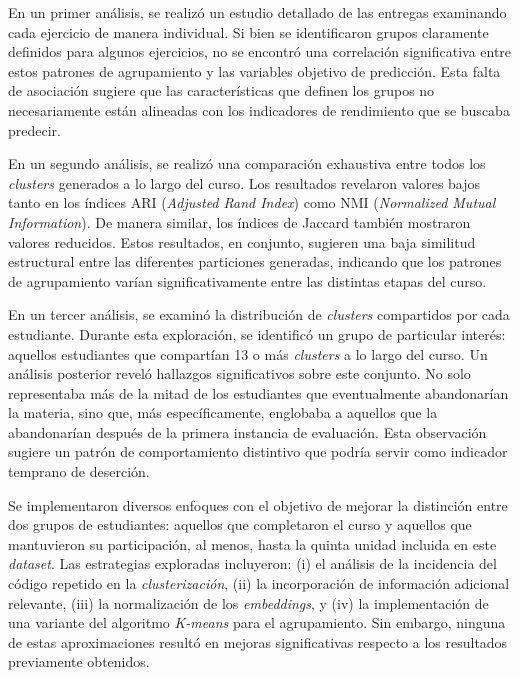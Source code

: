 \documentclass[11pt,a4paper,twoside,openany]{tesis}
\begin{document}
En un primer análisis, se realizó un estudio detallado de las entregas examinando cada ejercicio de manera individual. Si bien se identificaron grupos claramente definidos para algunos ejercicios, no se encontró una correlación significativa entre estos patrones de agrupamiento y las variables objetivo de predicción. Esta falta de asociación sugiere que las características que definen los grupos no necesariamente están alineadas con los indicadores de rendimiento que se buscaba predecir.

En un segundo análisis, se realizó una comparación exhaustiva entre todos los \emph{clusters} generados a lo largo del curso. Los resultados revelaron valores bajos tanto en los índices ARI (\emph{Adjusted Rand Index}) como NMI (\emph{Normalized Mutual Information}). De manera similar, los índices de Jaccard también mostraron valores reducidos. Estos resultados, en conjunto, sugieren una baja similitud estructural entre las diferentes particiones generadas, indicando que los patrones de agrupamiento varían significativamente entre las distintas etapas del curso.

En un tercer análisis, se examinó la distribución de \emph{clusters} compartidos por cada estudiante. Durante esta exploración, se identificó un grupo de particular interés: aquellos estudiantes que compartían 13 o más \emph{clusters} a lo largo del curso. Un análisis posterior reveló hallazgos significativos sobre este conjunto. No solo representaba más de la mitad de los estudiantes que eventualmente abandonarían la materia, sino que, más específicamente, englobaba a aquellos que la abandonarían después de la primera instancia de evaluación. Esta observación sugiere un patrón de comportamiento distintivo que podría servir como indicador temprano de deserción.

Se implementaron diversos enfoques con el objetivo de mejorar la distinción entre dos grupos de estudiantes: aquellos que completaron el curso y aquellos que mantuvieron su participación, al menos, hasta la quinta unidad incluida en este \emph{dataset}. Las estrategias exploradas incluyeron: (i) el análisis de la incidencia del código repetido en la \emph{clusterización}, (ii) la incorporación de información adicional relevante, (iii) la normalización de los \emph{embeddings}, y (iv) la implementación de una variante del algoritmo \emph{K-means} para el agrupamiento. Sin embargo, ninguna de estas aproximaciones resultó en mejoras significativas respecto a los resultados previamente obtenidos.
\end{document}
